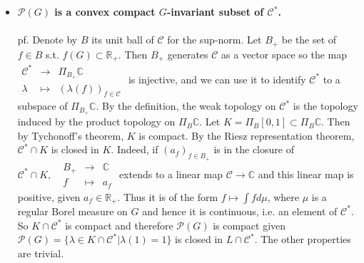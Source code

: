 \documentclass[12pt,letterpaper]{report}
\begin{document}
\begin{itemize}
\\\\pf. Let $g_{0}\in G,\,\,\,\lambda_{0}\in \mathcal{C}^{*},\,\,\,f\in \mathcal{C},\,\,\,r\in\mathbb{R}_{++}$. Let $||\lambda_{0}||=\sup\{||\lambda_{0}(f_{1})||_{\infty},\,\,\,\,f_{1}\in\mathcal{C},\,\,\,||f_{1}||_{\infty}=1\}$. Then $||\lambda_{0}||<\infty$ since $\lambda_{0}$ is continuous and $||\lambda_{0}(f_{1})||_{\infty}\leq||\lambda_{0}||||f_{1}||_{\infty},\,\,\,\forall f_{1}\in\mathcal{C}$. Then by the previous statement, there exists a nhood $W$ of $g_{0}$ in $G$ s.t. $\forall g\in W,\,\,\,||g^{-1}f-g_{0}^{-1}f||_{\infty}<\frac{r}{2(1+||\lambda_{0}||)}$. Let $U\equiv\{\lambda\in\mathcal{C}^{*}:|(\lambda-\lambda_{0})(g^{-1}f)|<r/2\}$. Then $U$ is a nhood of $\lambda_{0}$ in $\mathcal{C}^{*}$ and $\forall g\in W,\,\,\,\,\,\forall\lambda\in U,\,\,\,\,|(g\lambda-g_{0}\lambda_{0})(f)|=|\lambda(g^{-1}f)-\lambda_{0}(g^{-1}f)|+|\lambda_{0}(g^{-1}f)-\lambda_{0}(g_{0}^{-1}f)|<r$. 
\item \textbf{$\mathcal{P}(G)$ is a convex compact $G$-invariant subset of $\mathcal{C}^{*}$.}
\\\\pf. Denote by $B$ its unit ball of $\mathcal{C}$ for the sup-norm. Let $B_{+}$ be the set of $f\in B$ s.t. $f(G)\subset\mathbb{R}_{+}$. Then $B_{+}$ generates $\mathcal{C}$ as a vector space so the map $\begin{array}{rrr}\mathcal{C}^{*}&\rightarrow&\Pi_{B_{+}}\mathbb{C}\\\lambda&\mapsto&(\lambda(f))_{f\in\mathcal{C}}\end{array}$ is injective, and we can use it to identify $\mathcal{C}^{*}$ to a subspace of $\Pi_{B_{+}}\mathbb{C}$. By the definition, the weak topology on $\mathcal{C}^{*}$ is the topology induced by the product topology on $\Pi_{B}\mathbb{C}$. Let $K=\Pi_{B}[0,1]\subset\Pi_{B}\mathbb{C}$. Then by Tychonoff's theorem, $K$ is compact. By the Riesz representation theorem, $\mathcal{C}^{*}\cap K$ is closed in $K$. Indeed, if $(a_{f})_{f\in B_{+}}$ is in the closure of $\mathcal{C}^{*}\cap K,\,\,\,\,\begin{array}{rrr}B_{+}&\rightarrow&\mathbb{C}\\f&\mapsto&a_{f}\end{array}$ extends to a linear map $\mathcal{C}\rightarrow\mathbb{C}$ and this linear map is positive, given $a_{f}\in\mathbb{R}_{+}$. Thus it is of the form $f\mapsto \int fd\mu$, where $\mu$ is a regular Borel measure on $G$ and hence it is continuous, i.e. an element of $\mathcal{C}^{*}$. So $K\cap \mathcal{C}^{*}$ is compact and therefore $\mathcal{P}(G)$ is compact given $\mathcal{P}(G)=\{\lambda\in K\cap\mathcal{C}^{*}|\lambda(1)=1\}$ is closed in $L\cap\mathcal{C}^{*}$. The other properties are trivial. 

\end{itemize}
\end{document}
